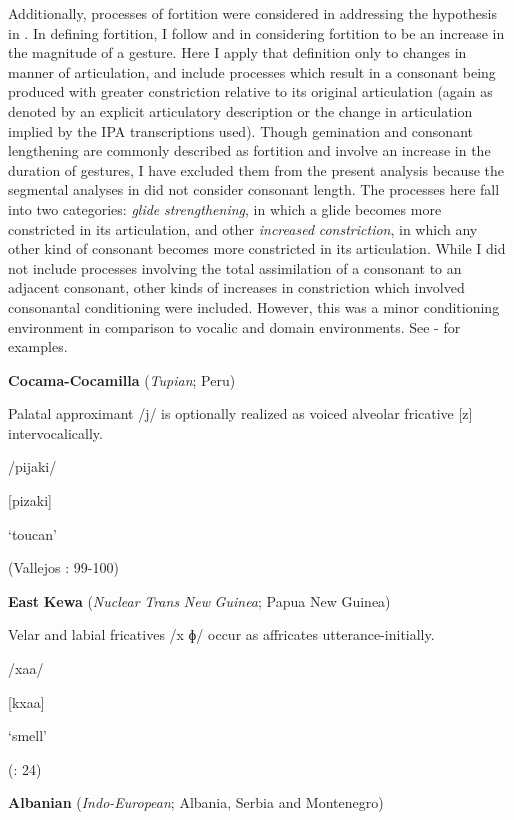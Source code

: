   Additionally, processes of fortition were considered in addressing the hypothesis in . In defining fortition, I follow \citet{Bybee2015b} and \citet{BybeeEasterday2019} in considering fortition to be an increase in the magnitude of a gesture. Here I apply that definition only to changes in manner of articulation, and include processes which result in a consonant being produced with greater constriction relative to its original articulation (again as denoted by an explicit articulatory description or the change in articulation implied by the IPA transcriptions used). Though gemination and consonant lengthening are commonly described as fortition and involve an increase in the duration of gestures, I have excluded them from the present analysis because the segmental analyses in  did not consider consonant length. The processes here fall into two categories: \textit{glide} \textit{strengthening}, in which a glide becomes more constricted in its articulation, and other \textit{increased} \textit{constriction}, in which any other kind of consonant becomes more constricted in its articulation. While I did not include processes involving the total assimilation of a consonant to an adjacent consonant, other kinds of increases in constriction which involved consonantal conditioning were included. However, this was a minor conditioning environment in comparison to vocalic and domain environments. See - for examples.

\ea\label{ex:(7.9)}
  \textbf{Cocama-Cocamilla} (\textit{Tupian}; Peru)

Palatal approximant /j/ is optionally realized as voiced alveolar fricative [z] intervocalically.

/pijaki/

[pizaki]

\glt ‘toucan’

(Vallejos \citealt{Yopán2010}: 99-100)
\z

\ea\label{ex:(7.10)}
  \textbf{East} \textbf{Kewa} (\textit{Nuclear} \textit{Trans} \textit{New} \textit{Guinea}; Papua New Guinea)

Velar and labial fricatives /x ɸ/ occur as affricates utterance-initially.

/xaa/

[kxaa]

\glt ‘smell’

(\citealt{FranklinFranklin1978}: 24)
\z

\ea\label{ex:(7.11)}
  \textbf{Albanian} (\textit{Indo-European}; Albania, Serbia and Montenegro)

